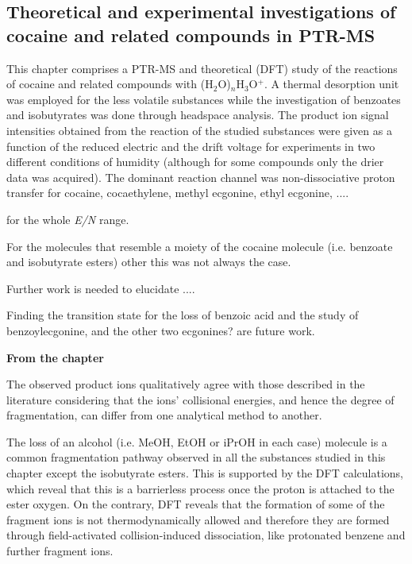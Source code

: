 \subsection{Theoretical and experimental investigations of cocaine and related compounds
in PTR-MS}

This chapter comprises a PTR-MS and theoretical (DFT) study of the reactions of cocaine and related compounds with (H$_2$O)$_n$H$_3$O$^+$.
%
A thermal desorption unit was employed for the less volatile substances while the investigation of benzoates and isobutyrates was done through headspace analysis.
%
The product ion signal intensities obtained from the reaction of the studied substances were given as a function of the reduced electric and the drift voltage for experiments in two different conditions of humidity (although for some compounds only the drier data was acquired).
%
The dominant reaction channel was non-dissociative proton transfer for cocaine, cocaethylene, methyl ecgonine, ethyl ecgonine, ....

for the whole \textit{E/N} range.












For the molecules that resemble a moiety of the cocaine molecule (i.e. benzoate and isobutyrate esters) other this was not always the case.


Further work is needed to elucidate ....

Finding the transition state for the loss of benzoic acid and the study of benzoylecgonine, and the other two ecgonines? are future work.


\vspace{1.5in}\textbf{From the chapter}


%
The observed product ions qualitatively agree with those described in the literature considering that the ions' collisional energies, and hence the degree of fragmentation, can differ from one analytical method to another. 



The loss of an alcohol (i.e. MeOH, EtOH or iPrOH in each case) molecule  is a common fragmentation pathway observed in all the substances studied in this chapter except the isobutyrate esters.
%
This is supported by the DFT calculations, which reveal that this is a barrierless process once the proton is attached to the %
ester oxygen.
%
On the contrary, DFT reveals that the formation of some of the fragment ions is not thermodynamically allowed and therefore they are formed through field-activated collision-induced dissociation, like protonated benzene and further fragment ions.

